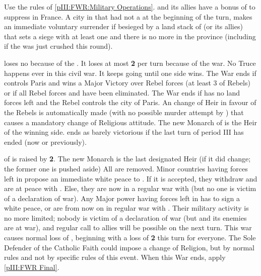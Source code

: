 \begin{digressions}



  \phmil
  \aparag Use the rules of \ref{pIII:FWR:Military Operations}.
  \aparag \FRA and its allies have a bonus of  to suppress \REVOLT
  in France.
  \aparag A city in \FRA that had not a \REVOLT \faceplus at the beginning of
  the turn, makes an immediate voluntary surrender if besieged by a land stack
  of \FRA (or its allies) that sets a siege with at least one \ARMY \faceplus
  and there is no more \REVOLT in the province (including if the \REVOLT was
  just crushed this round).



  \phpaix
  \aparag \FRA loses no \STAB because of the \REVOLT . It loses at most {\bf
    2} \STAB per turn because of the war.
  \aparag No Truce happens ever in this civil war. It keeps going until one
  side wins.
  \aparag The War ends if \FRA controls Paris and wins a Major Victory over
  Rebel forces (at least 3 \DT of Rebels) or if all Rebel forces and \REVOLT
  have been eliminated.
  \aparag The War ends if \FRA has no land forces left and the Rebel controls
  the city of Paris. An change of Heir in favour of the Rebels is
  automatically made (with no possible murder attempt by \FRA) that causes a
  mandatory change of Religious attitude. The new Monarch of \FRA is the Heir
  of the winning side.
  \aparag \FRA ends as barely victorious if the last turn of period III has
  ended (now or previously).



  \phpaix
  \aparag \STAB of \FRA is raised by {\bf 2}.
  \bparag The new Monarch is the last designated Heir (if it did change; the
  former one is pushed aside)
  \bparag All \REVOLT %
  are removed.
  \bparag Minor countries having forces left in \FRA propose an immediate
  white peace to \FRA. If it is accepted, they withdraw and are at peace with
  \FRA. Else, they are now in a regular war with \FRA (but no one is victim of
  a declaration of war).
  \bparag Any Major power having forces left in \FRA has to sign a white
  peace, or are from now on in regular war with \FRA.  Their military activity
  is no more limited; nobody is victim of a declaration of war (but \FRA and
  its enemies are at war), and regular call to allies will be possible on the
  next turn.  This war causes normal loss of \STAB, beginning with a loss of
  {\bf 2} \STAB this turn for everyone.  The Sole Defender of the Catholic
  Faith could impose a change of Religion, but by normal rules and not by
  specific rules of this event.
  \bparag When this War ends, apply \ref{pIII:FWR Final}.
\end{digressions}



